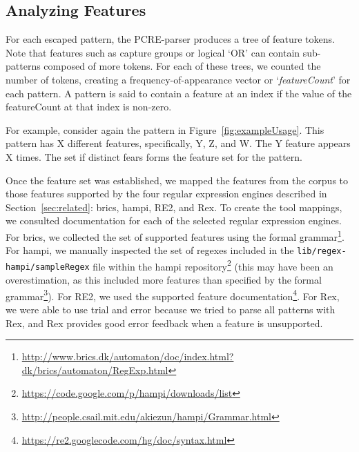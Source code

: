 \subsection{Analyzing Features}
\label{study:features}
For each escaped pattern, the PCRE-parser produces a tree of feature tokens. Note that features such as capture groups or logical `OR' can contain sub-patterns composed of more tokens.  For each of these trees, we counted the number of tokens, creating a frequency-of-appearance vector or `\emph{featureCount}' for each pattern.  A pattern is said to contain a feature at an index if the value of the featureCount at that index is non-zero.  

For example, consider again the pattern in Figure~\ref{fig:exampleUsage}. This pattern has X different features, specifically, Y, Z, and W. The Y feature appears X times. The set if distinct fears forms the feature set for the pattern. 

Once the feature set was established, we mapped the features from the corpus to those features supported by the four regular expression engines described in Section~\ref{sec:related}: brics, hampi, RE2, and Rex.
To create the tool mappings, we consulted documentation for each of the selected regular expression engines. For brics, we collected the set of supported features using the formal grammar\footnote{\url{http://www.brics.dk/automaton/doc/index.html?dk/brics/automaton/RegExp.html}}.  For hampi, we manually inspected the set of regexes included in the {\tt lib/regex-hampi/sampleRegex} file within the hampi repository\footnote{\url{https://code.google.com/p/hampi/downloads/list}} (this may have been an overestimation, as this included more features than specified by the formal grammar\footnote{\url{http://people.csail.mit.edu/akiezun/hampi/Grammar.html}}).  For RE2, we used the  supported feature documentation\footnote{\url{https://re2.googlecode.com/hg/doc/syntax.html}}.  For Rex, we were able to use trial and error because we tried to parse all patterns with Rex, and Rex provides good error feedback when a feature is unsupported.


